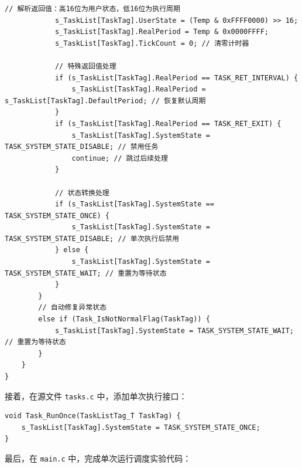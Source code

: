 \begin{lstlisting}[style=c]
            // 解析返回值：高16位为用户状态，低16位为执行周期
            s_TaskList[TaskTag].UserState = (Temp & 0xFFFF0000) >> 16;
            s_TaskList[TaskTag].RealPeriod = Temp & 0x0000FFFF;
            s_TaskList[TaskTag].TickCount = 0; // 清零计时器

            // 特殊返回值处理
            if (s_TaskList[TaskTag].RealPeriod == TASK_RET_INTERVAL) {
                s_TaskList[TaskTag].RealPeriod = s_TaskList[TaskTag].DefaultPeriod; // 恢复默认周期
            }
            if (s_TaskList[TaskTag].RealPeriod == TASK_RET_EXIT) {
                s_TaskList[TaskTag].SystemState = TASK_SYSTEM_STATE_DISABLE; // 禁用任务
                continue; // 跳过后续处理
            }

            // 状态转换处理
            if (s_TaskList[TaskTag].SystemState == TASK_SYSTEM_STATE_ONCE) {
                s_TaskList[TaskTag].SystemState = TASK_SYSTEM_STATE_DISABLE; // 单次执行后禁用
            } else {
                s_TaskList[TaskTag].SystemState = TASK_SYSTEM_STATE_WAIT; // 重置为等待状态
            }
        }
        // 自动修复异常状态
        else if (Task_IsNotNormalFlag(TaskTag)) {
            s_TaskList[TaskTag].SystemState = TASK_SYSTEM_STATE_WAIT; // 重置为等待状态
        }
    }
}
\end{lstlisting}

接着，在源文件 \texttt{tasks.c} 中，添加单次执行接口：

\begin{lstlisting}[style=c]
void Task_RunOnce(TaskListTag_T TaskTag) {
    s_TaskList[TaskTag].SystemState = TASK_SYSTEM_STATE_ONCE;
}
\end{lstlisting}

最后，在 \texttt{main.c} 中，完成单次运行调度实验代码：


